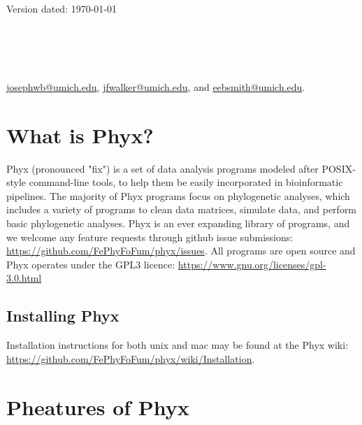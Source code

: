 \documentclass[12pt,letterpaper]{memoir}
\begin{document}
\begin{flushright}
Version dated: \today
\end{flushright}
\bigskip

\\
\\
\\
\\

\medskip
{} \href{josephwb@umich.edu}{josephwb@umich.edu}, \href{jfwalker@umich.edu}{jfwalker@umich.edu}, and \href{eebsmith@umich.edu}{eebsmith@umich.edu}.\\
\medskip

\section{What is Phyx?}\label{abstract}
Phyx (pronounced "fix") is a set of data analysis programs modeled after POSIX-style command-line tools, to help them be easily incorporated in bioinformatic pipelines. The majority of Phyx programs focus on phylogenetic analyses, which includes a variety of programs to clean data matrices, simulate data, and perform basic phylogenetic analyses. Phyx is an ever expanding library of programs, and we welcome any feature requests through github issue submissions: \href{https://github.com/FePhyFoFum/phyx/issues}{https://github.com/FePhyFoFum/phyx/issues}. 
All programs are open source and Phyx operates under the GPL3 licence: \href{https://www.gnu.org/licenses/gpl-3.0.html}{https://www.gnu.org/licenses/gpl-3.0.html}

\subsection{Installing Phyx}\label{introduction}
\begin{flushleft}
Installation instructions for both unix and mac may be found at the Phyx wiki: \href{https://github.com/FePhyFoFum/phyx/wiki/Installation}{https://github.com/FePhyFoFum/phyx/wiki/Installation}.
\end{flushleft}

\section{Pheatures of Phyx}
\end{document}
